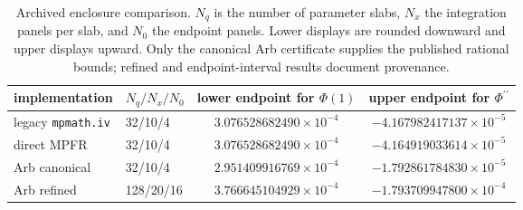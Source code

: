 \begin{table}[tbp]
\centering
\footnotesize
\setlength{\tabcolsep}{4pt}
\begin{tabular}{llcc}
\toprule
implementation & $N_q/N_x/N_0$ & lower endpoint for $\Phi(1)$ & upper endpoint for $\Phi^{\prime\prime}$ \\
\midrule
legacy \texttt{mpmath.iv} & 32/10/4 & $3.076528682490\times 10^{-4}$ & $-4.167982417137\times 10^{-5}$ \\
direct MPFR & 32/10/4 & $3.076528682490\times 10^{-4}$ & $-4.164919033614\times 10^{-5}$ \\
Arb canonical & 32/10/4 & $2.951409916769\times 10^{-4}$ & $-1.792861784830\times 10^{-5}$ \\
Arb refined & 128/20/16 & $3.766645104929\times 10^{-4}$ & $-1.793709947800\times 10^{-4}$ \\
\bottomrule
\end{tabular}
\caption{Archived enclosure comparison. $N_q$ is the number of parameter slabs, $N_x$ the integration panels per slab, and $N_0$ the endpoint panels. Lower displays are rounded downward and upper displays upward. Only the canonical Arb certificate supplies the published rational bounds; refined and endpoint-interval results document provenance.}
\label{tab:enclosure-reconciliation}
\end{table}
